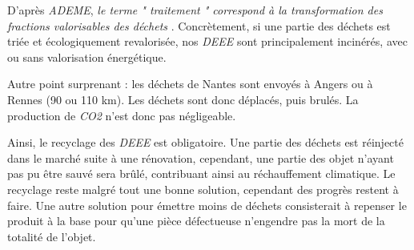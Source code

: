 D'après \textit{ADEME}\cite{ADEME_unite_traitement}, \og \textit{le terme " traitement " correspond à la transformation des fractions valorisables des déchets}  \fg{}. Concrètement, si une partie des déchets est triée et écologiquement revalorisée, nos \textit{DEEE} sont principalement incinérés, avec ou sans valorisation énergétique. 

Autre point surprenant : les déchets de Nantes sont envoyés à Angers ou à Rennes (90 ou 110 km).   Les déchets sont donc déplacés, puis brulés. La production de \textit{CO2} n'est donc pas négligeable. 

\bigbreak

Ainsi, le recyclage des \textit{DEEE} est obligatoire. Une partie des déchets est réinjecté dans le marché suite à une rénovation, cependant, une partie des objet n'ayant pas pu être sauvé sera brûlé, contribuant ainsi au réchauffement climatique. Le recyclage reste malgré tout une bonne solution, cependant des progrès restent à faire. 
\medbreak
Une autre solution pour émettre moins de déchets consisterait à repenser le produit à la base pour qu'une pièce défectueuse n'engendre pas la mort de la totalité de l'objet. 
